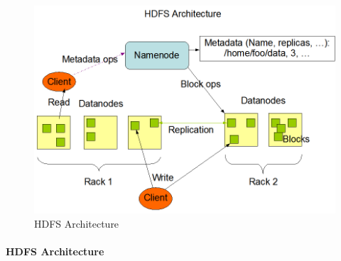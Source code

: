 \documentclass[12pt,english]{book}
\begin{document}
\newpage
\begin{figure}[t]
	\centering
	\includegraphics[width=\linewidth]{hdfsArch}
	\caption[HDFS Architecture]{HDFS Architecture \footnotemark}
\end{figure}

\paragraph{HDFS Architecture}
\end{document}
